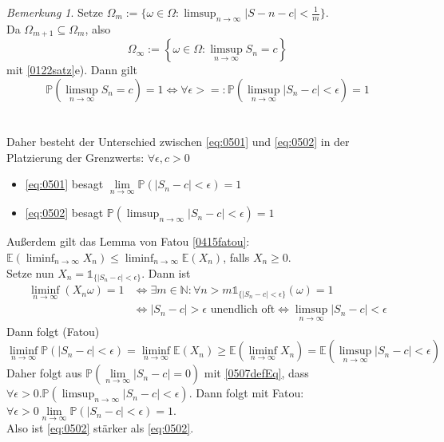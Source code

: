 \documentclass[10pt,a4paper]{article}
\newcommand{\N}{\ensuremath{\mathbb{N}}}
\newcommand{\abs}[1]{\left|#1\right|}
\newcommand{\cha}{\mathds{1}}
\newcommand{\Prb}{\mathbb P}
\newcommand{\Epv}{\ensuremath{\mathbb{E}}}
\theoremstyle{plain}
\theoremstyle{definition}
\theoremstyle{remark}
\newtheorem{bem}[theorem]{Bemerkung}
\begin{document}
	\begin{bem}\label{0508bem}
		Setze $\Omega_m:=\{\omega\in\Omega:\limsup_{n\to\infty}\abs{S-n-c}<\frac{1}{m}\}$.\\
		Da $\Omega_{m+1}\subseteq\Omega_m$, also 
		\[\Omega_\infty:=\left\{\omega\in\Omega:\limsup_{n\to\infty}S_n=c\right\}\]
		mit \ref{0122satz}e). Dann gilt
		\[\Prb\left(\limsup_{n\to\infty} S_n=c\right)=1\Leftrightarrow \forall\epsilon>=:\Prb\left(\limsup_{n\to\infty}\abs{S_n-c}<\epsilon\right)=1\tag{\star\star\star}\label{0507defEq}\]\\
		\\
		Daher besteht der Unterschied zwischen \ref{eq:0501} und \ref{eq:0502} in der Platzierung der Grenzwerts: $\forall\epsilon,c>0$
		\begin{itemize}
			\item \ref{eq:0501} besagt $\lim\limits_{n\to\infty}\Prb\left(\abs{S_n-c}<\epsilon\right)=1$
			\item \ref{eq:0502} besagt 
			$\Prb\left(\limsup_{n\to\infty}\abs{S_n-c}<\epsilon\right)=1$
		\end{itemize}
		Außerdem gilt das Lemma von Fatou \ref{0415fatou}: $\Epv\left(\liminf_{n\to\infty} X_n\right)\leq\liminf_{n\to\infty}\Epv(X_n)$, falls $X_n\geq 0$.\\
		Setze nun $X_n=\cha_{\{\abs{S_n-c}<\epsilon\}}$. Dann ist
		\begin{align*}
		\liminf_{n\to\infty}(X_n\omega)=1&\Leftrightarrow \exists m\in\N:\forall n>m\cha_{\{\abs{S_n-c}<\epsilon\}}(\omega)=1\\
		&\Leftrightarrow\abs{S_n-c}>\epsilon\text{ unendlich oft}\Leftrightarrow\limsup_{n\to\infty}\abs{S_n-c}<\epsilon
		\end{align*}
		Dann folgt (Fatou)
		\[\liminf_{n\to\infty}\Prb(\abs{S_n-c}<\epsilon)=\liminf_{n\to\infty}\Epv(X_n)\geq \Epv\left(\liminf_{n\to\infty}X_n\right)=\Epv\left(\limsup_{n\to\infty}\abs{S_n-c}<\epsilon\right)\]
		Daher folgt aus $\Prb\left(\lim\limits_{n\to\infty}\abs{S_n-c}=0\right)$ mit \ref{0507defEq}, dass $\forall\epsilon>0.\Prb\left(\limsup_{n\to\infty}\abs{S_n-c}<\epsilon\right)$.
		Dann folgt mit Fatou: $\forall\epsilon>0\lim\limits_{n\to\infty}\Prb\left(\abs{ S_n-c}<\epsilon\right)=1$.\\
		Also ist \ref{eq:0502} stärker als \ref{eq:0502}.
	\end{bem}
	
\end{document}
